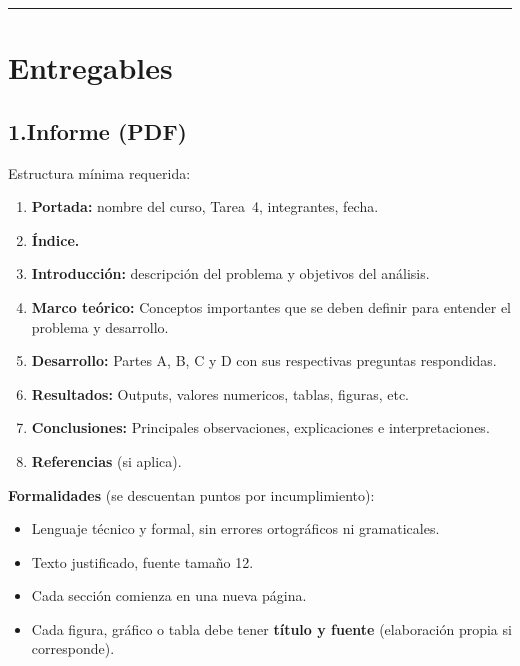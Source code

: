 \documentclass[12pt,a4paper]{article}
\begin{document}
\noindent\rule{\linewidth}{0.4pt}

\section*{Entregables}

\subsection*{1.\quad Informe (PDF)}

Estructura mínima requerida:

\begin{enumerate}[leftmargin=*, topsep=2pt]
    \item \textbf{Portada:} nombre del curso, Tarea~4, integrantes, fecha.
    \item \textbf{Índice.}
    \item \textbf{Introducción:} descripción del problema y objetivos del
          análisis. 
    \item \textbf{Marco teórico:} Conceptos importantes que se deben definir
          para entender el problema y desarrollo.
    \item \textbf{Desarrollo:} Partes A, B, C y D con sus respectivas
          preguntas respondidas.
    \item \textbf{Resultados:} Outputs, valores numericos, tablas, figuras, etc.
    \item \textbf{Conclusiones:} Principales observaciones, explicaciones e interpretaciones.
    \item \textbf{Referencias} (si aplica).
\end{enumerate}

\textbf{Formalidades} (se descuentan puntos por incumplimiento):

\begin{itemize}[topsep=2pt]
    \item Lenguaje técnico y formal, sin errores ortográficos ni gramaticales.
    \item Texto justificado, fuente tamaño 12.
    \item Cada sección comienza en una nueva página.
    \item Cada figura, gráfico o tabla debe tener \textbf{título y fuente}
          (elaboración propia si corresponde).
\end{itemize}
\end{document}
